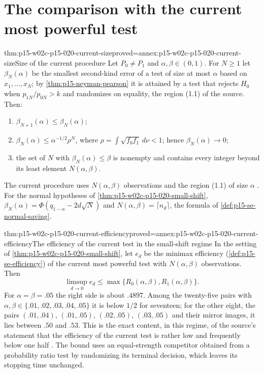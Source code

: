 \section{The comparison with the current most powerful test}
\label{sec:p15-w02c-p15-020-current}

\begin{hbtheorem}{thm:p15-w02c-p15-020-current-size}{proved=annex:p15-w02c-p15-020-current-size}{Size of the current procedure}
Let \(P_0\neq P_1\) and \(\alpha,\beta\in(0,1)\). For \(N\geq1\) let
\(\beta_N(\alpha)\) be the smallest second-kind error of a test of size
at most \(\alpha\) based on \(x_1,\ldots,x_N\); by
\cref{thm:p15-neyman-pearson} it is attained by a test that rejects
\(H_0\) when \(p_{1N}/p_{0N}>k\) and randomizes on equality, the region
(1.1) of the source. Then:
\begin{enumerate}
\item \(\beta_{N+1}(\alpha)\leq\beta_N(\alpha)\);
\item \(\beta_N(\alpha)\leq\alpha^{-1/2}\rho^N\), where
 \(\rho=\int\sqrt{f_0f_1}\,d\nu<1\); hence \(\beta_N(\alpha)\to0\);
\item the set of \(N\) with \(\beta_N(\alpha)\leq\beta\) is nonempty and
 contains every integer beyond its least element \(N(\alpha,\beta)\).
\end{enumerate}
The current procedure uses \(N(\alpha,\beta)\) observations and the
region (1.1) of size \(\alpha\)
\cite[Introduction, p.~118; Section 1, p.~122]{Wald1945SequentialTests}.
For the normal hypotheses of \cref{thm:p15-w02c-p15-020-small-shift},
\(\beta_N(\alpha)=\Phi(q_{1-\alpha}-2d\sqrt N)\) and
\(N(\alpha,\beta)=\lceil n_d\rceil\), the formula of
\cref{def:p15-se-normal-saving}.
\end{hbtheorem}

\begin{hbtheorem}{thm:p15-w02c-p15-020-current-efficiency}{proved=annex:p15-w02c-p15-020-current-efficiency}{The efficiency of the current test in the small-shift regime}
In the setting of \cref{thm:p15-w02c-p15-020-small-shift}, let \(e_d\)
be the minimax efficiency (\cref{def:p15-se-efficiency}) of the current
most powerful test with \(N(\alpha,\beta)\) observations. Then
\[
 \limsup_{d\to0}e_d\leq\max\{R_0(\alpha,\beta),R_1(\alpha,\beta)\}.
\]
For \(\alpha=\beta=.05\) the right side is about \(.4897\). Among the
twenty-five pairs with \(\alpha,\beta\in\{.01,.02,.03,.04,.05\}\) it is
below \(1/2\) for seventeen; for the other eight, the pairs
\((.01,.04)\), \((.01,.05)\), \((.02,.05)\), \((.03,.05)\) and their
mirror images, it lies between \(.50\) and \(.53\). This is the exact
content, in this regime, of the source's statement that the efficiency
of the current test is rather low and frequently below one half
\cite[Section 2.3, p.~125]{Wald1945SequentialTests}. The bound uses an
equal-strength competitor obtained from a probability ratio test by
randomizing its terminal decision, which leaves its stopping time
unchanged.
\end{hbtheorem}

